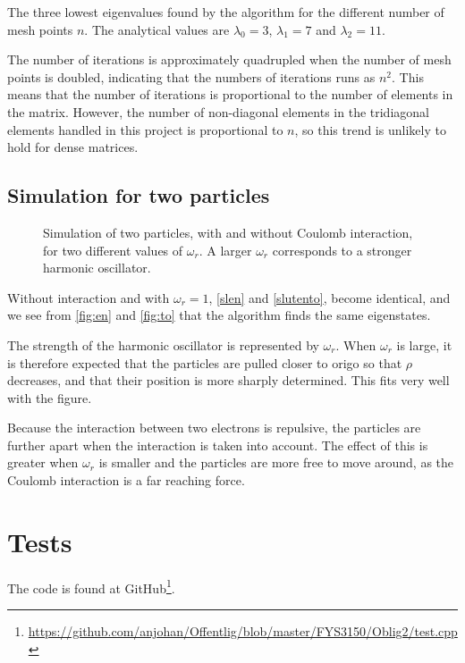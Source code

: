 \documentclass[12pt,english,a4paper]{report}
\begin{document}
\begin{table}[H]
\[

\]
\caption{The three lowest eigenvalues found by the algorithm for the different number of mesh points \(n\). The analytical values are \(\lambda_0=3\), \(\lambda_1=7\) and \(\lambda_2=11\).}
\end{table}
The number of iterations is approximately quadrupled when the number of mesh points is doubled, indicating that the numbers of iterations runs as \(n^2\). This means that the number of iterations is proportional to the number of elements in the matrix. However, the number of non-diagonal elements in the tridiagonal elements handled in this project is proportional to \(n\), so this trend is unlikely to hold for dense matrices.


\subsection{Simulation for two particles}
\begin{figure}[H]
\centering

\caption{Simulation of two particles, with and without Coulomb interaction, for two different values of \(\omega_r\). A larger \(\omega_r\) corresponds to a stronger harmonic oscillator.}\label{fig:to}
\end{figure}

Without interaction and with \(\omega_r=1\), \ref{slen} and \ref{slutento}, become identical, and we see from \vref{fig:en} and \vref{fig:to} that the algorithm finds the same eigenstates.

The strength of the harmonic oscillator is represented by \(\omega_r\). When \(\omega_r\) is large, it is therefore expected that the particles are pulled closer to origo so that \(\rho\) decreases, and that their position is more sharply determined. This fits very well with the figure.

Because the interaction between two electrons is repulsive, the particles are further apart when the interaction is taken into account. The effect of this is greater when \(\omega_r\) is smaller and the particles are more free to move around, as the Coulomb interaction is a far reaching force.

%

\section{Tests}
The code is found at GitHub\footnote{\url{https://github.com/anjohan/Offentlig/blob/master/FYS3150/Oblig2/test.cpp}}.
\end{document}
